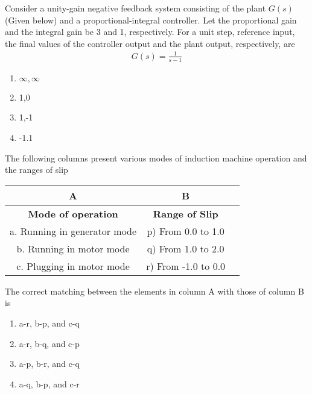 \iffalse
\title{Assignment13}
\author{ee24btech11064}
\chapter{2023}
\section{ee}
\fi

    \item Consider a unity-gain negative feedback system consisting of the plant $G(s)$(Given below) and a proportional-integral controller. Let the proportional gain and the integral gain be 3 and 1, respectively. For a unit step, reference input, the final values of the controller output and the plant output, respectively, are 
    \begin{align*}
        G(s)=\frac{1}{s-1}
    \end{align*}
    \begin{multicols}{2}
    \begin{enumerate}
            \item $\infty,\infty$
            \item 1,0
             \item 1,-1
            \item -1.1
    \end{enumerate}
    \end{multicols}
    \bigskip
\item The following columns present various modes of induction machine operation and the ranges of slip
\begin{center}
\begin{tabular}{|c|c|c|}
\hline
\multicolumn{1}{|c|}{\textbf{A}} & \multicolumn{1}{c|}{\textbf{B}} \\
\hline
\textbf{Mode of operation} &  \textbf{Range of Slip} \\
\hline
a.  Running in generator mode & p) From 0.0 to 1.0 \\
b. Running in motor mode     & q) From 1.0 to 2.0 \\
c.  Plugging in motor mode    & r) From -1.0 to 0.0 \\
\hline
\end{tabular}
\end{center}
The correct matching between the elements in column A with those of column B is
\begin{enumerate}
        \item a-r, b-p, and c-q
        \item a-r, b-q, and c-p
        \item a-p, b-r, and c-q
        \item a-q, b-p, and c-r
\end{enumerate}
